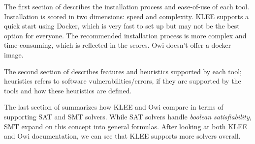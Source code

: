 
The first section of  describes the installation process and ease-of-use of each tool. Installation is scored in two dimensions: speed and complexity. KLEE supports a quick start using Docker, which is very fast to set up but may not be the best option for everyone. The recommended installation process is more complex and time-consuming, which is reflected in the scores. Owi doesn't offer a docker image. 

The second section of  describes features and heuristics supported by each tool; heuristics refers to software vulnerabilities/errors, if they are supported by the tools and how these heuristics are defined. %


The last section of  summarizes how KLEE and Owi compare in terms of supporting SAT and SMT solvers. While SAT solvers handle \textit{boolean satisfiability}, SMT expand on this concept into general formulas\cite{rbc_sat_solvers}. After looking at both KLEE and Owi documentation, we can see that KLEE supports more solvers overall.

